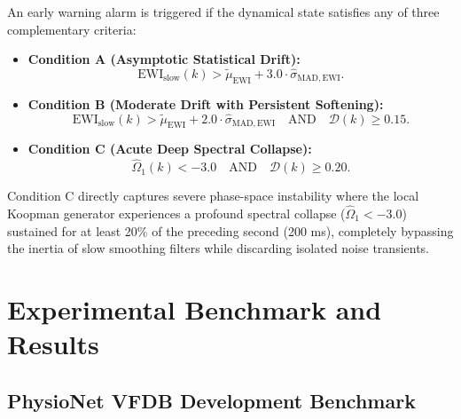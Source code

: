 \documentclass[11pt,a4paper]{article}
\begin{document}
An early warning alarm is triggered if the dynamical state satisfies any of three complementary criteria:
\begin{itemize}
    \item \textbf{Condition A (Asymptotic Statistical Drift):}
    \begin{equation}
    \mathrm{EWI}_{\mathrm{slow}}(k) > \tilde{\mu}_{\mathrm{EWI}} + 3.0 \cdot \hat{\sigma}_{\mathrm{MAD},\mathrm{EWI}}.
    \end{equation}
    \item \textbf{Condition B (Moderate Drift with Persistent Softening):}
    \begin{equation}
    \mathrm{EWI}_{\mathrm{slow}}(k) > \tilde{\mu}_{\mathrm{EWI}} + 2.0 \cdot \hat{\sigma}_{\mathrm{MAD},\mathrm{EWI}} \quad \text{AND} \quad \mathcal{D}(k) \ge 0.15.
    \end{equation}
    \item \textbf{Condition C (Acute Deep Spectral Collapse):}
    \begin{equation}
    \hat{\Omega}_1(k) < -3.0 \quad \text{AND} \quad \mathcal{D}(k) \ge 0.20.
    \end{equation}
\end{itemize}
Condition C directly captures severe phase-space instability where the local Koopman generator experiences a profound spectral collapse ($\hat{\Omega}_1 < -3.0$) sustained for at least 20\% of the preceding second (200 ms), completely bypassing the inertia of slow smoothing filters while discarding isolated noise transients.

\section{Experimental Benchmark and Results}

\subsection{PhysioNet VFDB Development Benchmark}
\end{document}
